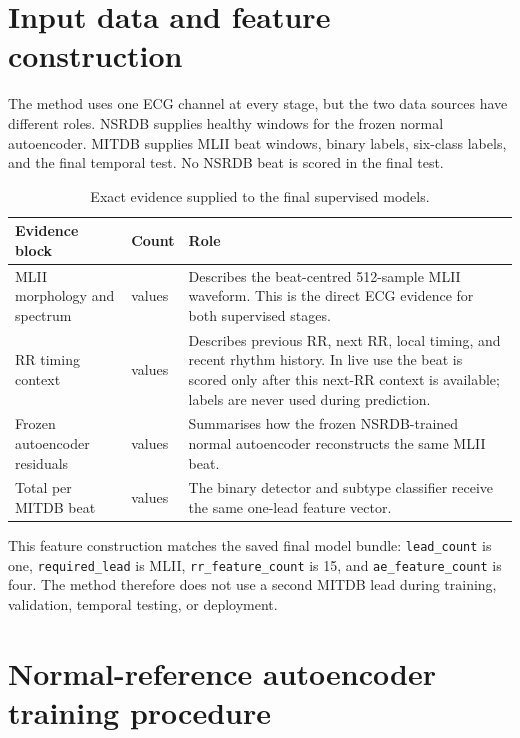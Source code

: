 \section{Input data and feature construction}

The method uses one ECG channel at every stage, but the two data sources have
different roles. NSRDB supplies healthy windows for the frozen normal
autoencoder. MITDB supplies MLII beat windows, binary labels, six-class labels,
and the final temporal test. No NSRDB beat is scored in the final test.

\begin{table}[H]
\centering
\caption{Exact evidence supplied to the final supervised models.}
\label{tab:method-feature-input}
\begin{tabular}{>{\raggedright\arraybackslash}p{}
                >{\raggedright\arraybackslash}p{}
                >{\raggedright\arraybackslash}p{}}
\toprule
Evidence block & Count & Role\\
\midrule
MLII morphology and spectrum & 223 values & Describes the beat-centred
512-sample MLII waveform. This is the direct ECG evidence for both supervised
stages.\\
RR timing context & 15 values & Describes previous RR, next RR, local timing,
and recent rhythm history. In live use the beat is scored only after this
next-RR context is available; labels are never used during prediction.\\
Frozen autoencoder residuals & 4 values & Summarises how the frozen
NSRDB-trained normal autoencoder reconstructs the same MLII beat.\\
\midrule
Total per MITDB beat & 242 values & The binary detector and subtype classifier
receive the same one-lead feature vector.\\
\bottomrule
\end{tabular}
\end{table}

This feature construction matches the saved final model bundle:
\texttt{lead\_count} is one, \texttt{required\_lead} is MLII,
\texttt{rr\_feature\_count} is 15, and \texttt{ae\_feature\_count} is four.
The method therefore does not use a second MITDB lead during training,
validation, temporal testing, or deployment.

\section{Normal-reference autoencoder training procedure}

